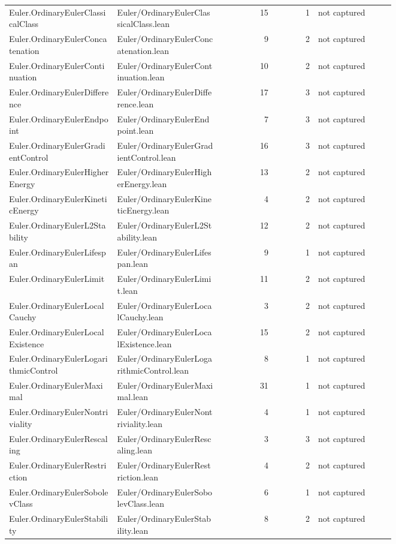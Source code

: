 \documentclass[10pt]{article}
\begin{document}
\begin{longtable}{p{0.28\linewidth}p{0.27\linewidth}r r p{0.20\linewidth}}
Euler.OrdinaryEulerClassicalClass & Euler/OrdinaryEulerClassicalClass.lean & 15 & 1 & not captured\\
Euler.OrdinaryEulerConcatenation & Euler/OrdinaryEulerConcatenation.lean & 9 & 2 & not captured\\
Euler.OrdinaryEulerContinuation & Euler/OrdinaryEulerContinuation.lean & 10 & 2 & not captured\\
Euler.OrdinaryEulerDifference & Euler/OrdinaryEulerDifference.lean & 17 & 3 & not captured\\
Euler.OrdinaryEulerEndpoint & Euler/OrdinaryEulerEndpoint.lean & 7 & 3 & not captured\\
Euler.OrdinaryEulerGradientControl & Euler/OrdinaryEulerGradientControl.lean & 16 & 3 & not captured\\
Euler.OrdinaryEulerHigherEnergy & Euler/OrdinaryEulerHigherEnergy.lean & 13 & 2 & not captured\\
Euler.OrdinaryEulerKineticEnergy & Euler/OrdinaryEulerKineticEnergy.lean & 4 & 2 & not captured\\
Euler.OrdinaryEulerL2Stability & Euler/OrdinaryEulerL2Stability.lean & 12 & 2 & not captured\\
Euler.OrdinaryEulerLifespan & Euler/OrdinaryEulerLifespan.lean & 9 & 1 & not captured\\
Euler.OrdinaryEulerLimit & Euler/OrdinaryEulerLimit.lean & 11 & 2 & not captured\\
Euler.OrdinaryEulerLocalCauchy & Euler/OrdinaryEulerLocalCauchy.lean & 3 & 2 & not captured\\
Euler.OrdinaryEulerLocalExistence & Euler/OrdinaryEulerLocalExistence.lean & 15 & 2 & not captured\\
Euler.OrdinaryEulerLogarithmicControl & Euler/OrdinaryEulerLogarithmicControl.lean & 8 & 1 & not captured\\
Euler.OrdinaryEulerMaximal & Euler/OrdinaryEulerMaximal.lean & 31 & 1 & not captured\\
Euler.OrdinaryEulerNontriviality & Euler/OrdinaryEulerNontriviality.lean & 4 & 1 & not captured\\
Euler.OrdinaryEulerRescaling & Euler/OrdinaryEulerRescaling.lean & 3 & 3 & not captured\\
Euler.OrdinaryEulerRestriction & Euler/OrdinaryEulerRestriction.lean & 4 & 2 & not captured\\
Euler.OrdinaryEulerSobolevClass & Euler/OrdinaryEulerSobolevClass.lean & 6 & 1 & not captured\\
Euler.OrdinaryEulerStability & Euler/OrdinaryEulerStability.lean & 8 & 2 & not captured\\

\end{longtable}
\end{document}
